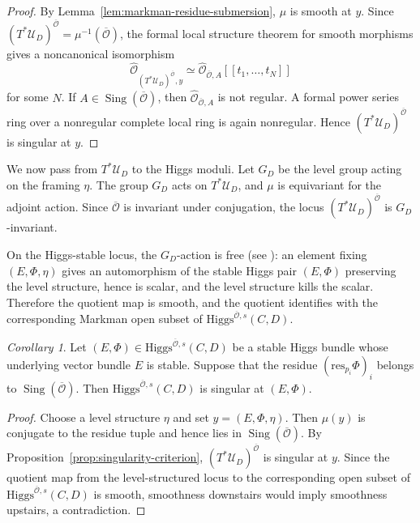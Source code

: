\documentclass[11pt]{amsart}
\theoremstyle{plain}
\theoremstyle{definition}
\theoremstyle{remark}
\newtheorem{corollary}[theorem]{Corollary}
\newcommand{\ov}[1]{\overline{#1}}
\newcommand{\cO}{\mathcal O}
\newcommand{\Higgs}{\mathrm{Higgs}}
\def\res{\mathrm{res}}
\begin{document}
\begin{proof}
	By Lemma~\ref{lem:markman-residue-submersion}, $\mu$ is smooth at $y$. Since
	$(T^*\mathcal U_D)^{\ov\cO}=\mu^{-1}(\ov\cO)$, the formal local structure theorem for smooth morphisms gives a noncanonical isomorphism
	\[
	\widehat{\cO}_{(T^*\mathcal U_D)^{\ov\cO},y}
	\simeq
	\widehat{\cO}_{\ov\cO,A}[[t_1,\ldots,t_N]]
	\]
	for some $N$. If $A\in\operatorname{Sing}(\ov\cO)$, then $\widehat{\cO}_{\ov\cO,A}$ is not regular. A formal power series ring over a nonregular complete local ring is again nonregular. Hence $(T^*\mathcal U_D)^{\ov\cO}$ is singular at $y$.
\end{proof}

We now pass from $T^*\mathcal{U}_D$ to the Higgs moduli. Let $G_D$ be the level group acting on the framing $\eta$. The group $G_D$ acts on $T^*\mathcal U_D$, and $\mu$ is equivariant for the adjoint action. Since $\ov\cO$ is invariant under conjugation, the locus $(T^*\mathcal U_D)^{\ov\cO}$ is $G_D$-invariant.

On the Higgs-stable locus, the $G_D$-action is free (see \cite[Lemma 6.7]{markmanspectral}): an element fixing $(E,\Phi,\eta)$ gives an automorphism of the stable Higgs pair $(E,\Phi)$ preserving the level structure, hence is scalar, and the level structure kills the scalar. Therefore the quotient map is smooth, and the quotient identifies with the corresponding Markman open subset of $\Higgs^{\ov\cO,s}(C,D)$.

\begin{corollary}\label{cor:singularity-downstairs}
	Let $(E,\Phi)\in\Higgs^{\ov\cO,s}(C,D)$ be a stable Higgs bundle whose underlying vector bundle $E$ is stable. Suppose that the residue $(\res_{p_i}\Phi)_i$ belongs to $\operatorname{Sing}(\ov\cO)$. Then $\Higgs^{\ov\cO,s}(C,D)$ is singular at $(E,\Phi)$.
\end{corollary}

\begin{proof}
	Choose a level structure $\eta$ and set $y=(E,\Phi,\eta)$. Then $\mu(y)$ is conjugate to the residue tuple and hence lies in $\operatorname{Sing}(\ov\cO)$. By Proposition~\ref{prop:singularity-criterion}, $(T^*\mathcal U_D)^{\ov\cO}$ is singular at $y$. Since the quotient map from the level-structured locus to the corresponding open subset of $\Higgs^{\ov\cO,s}(C,D)$ is smooth, smoothness downstairs would imply smoothness upstairs, a contradiction.
\end{proof}
\end{document}
